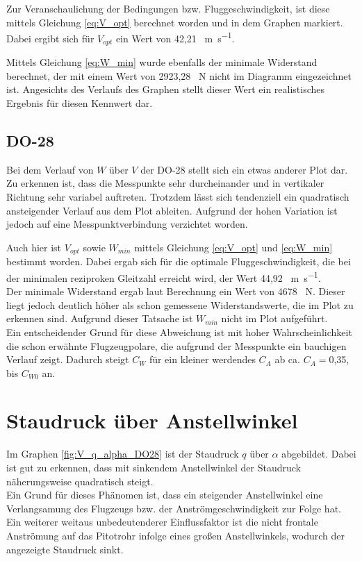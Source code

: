 Zur Veranschaulichung der \grqq{ } Bedingungen bzw. Fluggeschwindigkeit, ist diese mittels Gleichung \ref{eq:V_opt} berechnet worden und in dem Graphen markiert. Dabei ergibt sich für $V_{opt}$ ein Wert von 42,21 \SI{}{\meter\per\second}.

Mittels Gleichung \ref{eq:W_min} wurde ebenfalls der minimale Widerstand berechnet, der mit einem Wert von 2923,28 \SI{}{\newton} nicht im Diagramm eingezeichnet ist. Angesichts des Verlaufs des Graphen stellt dieser Wert ein realistisches Ergebnis für diesen Kennwert dar.

\subsection{DO-28}

Bei dem Verlauf von $W$ über $V$ der DO-28 stellt sich ein etwas anderer Plot dar. Zu erkennen ist, dass die Messpunkte sehr durcheinander und in vertikaler Richtung sehr variabel auftreten. Trotzdem lässt sich tendenziell ein quadratisch ansteigender Verlauf aus dem Plot ableiten. Aufgrund der hohen Variation ist jedoch auf eine Messpunktverbindung verzichtet worden.

Auch hier ist $V_{opt}$ sowie $W_{min}$ mittels Gleichung \ref{eq:V_opt} und \ref{eq:W_min} bestimmt worden. Dabei ergab sich für die optimale Fluggeschwindigkeit, die bei der minimalen reziproken Gleitzahl erreicht wird, der Wert 44,92 \SI{}{\meter\per\second}. \\ Der minimale Widerstand ergab laut Berechnung ein Wert von 4678 \SI{}{\newton}. Dieser liegt jedoch deutlich höher als schon gemessene Widerstandswerte, die im Plot zu erkennen sind. Aufgrund dieser Tatsache ist $W_{min}$ nicht im Plot aufgeführt. \\
Ein entscheidender Grund für diese Abweichung ist mit hoher Wahrscheinlichkeit die schon erwähnte Flugzeugpolare, die aufgrund der Messpunkte ein bauchigen Verlauf zeigt. Dadurch steigt $C_W$ für ein kleiner werdendes $C_A$ ab ca. $C_A=$0,35, bis $C_{W0}$ an.

\section{Staudruck über Anstellwinkel}

Im Graphen \ref{fig:V_q_alpha_DO28} ist der Staudruck $q$ über $\alpha$ abgebildet. Dabei ist gut zu erkennen, dass mit sinkendem Anstellwinkel der Staudruck näherungsweise quadratisch steigt. \\
Ein Grund für dieses Phänomen ist, dass ein steigender Anstellwinkel eine Verlangsamung des Flugzeugs bzw. der Anströmgeschwindigkeit zur Folge hat. Ein weiterer weitaus unbedeutenderer Einflussfaktor ist die nicht frontale Anströmung auf das Pitotrohr infolge eines großen Anstellwinkels, wodurch der angezeigte Staudruck sinkt.

